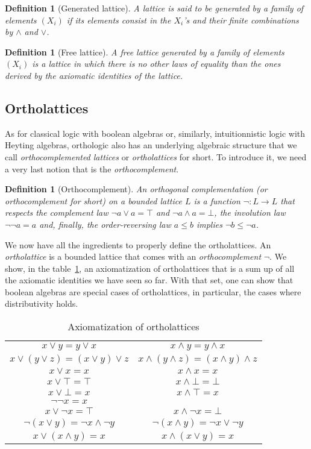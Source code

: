 \documentclass[a4paper, 11pt]{article}
\newtheorem{definition}[theorem]{Definition}
\begin{document}
    \begin{definition}[Generated lattice]
	    A lattice is said to be generated by a family of elements $(X_i)$ if its elements consist in
	    the $X_i$'s and their finite combinations by $\wedge$ and $\vee$.
    \end{definition}
    \begin{definition}[Free lattice]
	    A free lattice generated by a family of elements $(X_i)$ is a lattice in which there is no
	    other laws of equality than the ones derived by the axiomatic identities of the lattice.
    \end{definition}
    \subsection{Ortholattices}
    As for classical logic with boolean algebras or, similarly, intuitionnistic logic with Heyting 
    algebras, orthologic also has an underlying algebraic structure that we call 
    \textit{orthocomplemented lattices} or \textit{ortholattices} for short. To introduce it, we need
    a very last notion that is the \textit{orthocomplement}.
    \begin{definition}[Orthocomplement]
	    An orthogonal complementation (or orthocomplement for short) on a bounded lattice $L$ is a
	    function $\neg:L\rightarrow L$ that respects the complement law $\neg a\vee a=\top$ and
	    $\neg a\wedge a=\bot$, the involution law $\neg\neg a=a$ and, finally, the order-reversing
	    law $a\leq b$ implies $\neg b\leq\neg a$.
    \end{definition}
    We now have all the ingredients to properly define the ortholattices. An \textit{ortholattice} is a 
    bounded
    lattice that comes with an \textit{orthocomplement} $\neg$. We show, in the table~\ref{tab_ax},
    an axiomatization of ortholattices that is a sum up of all the axiomatic identities we have seen so
    far. With that set, one can show that boolean algebras are special cases of ortholattices, in 
    particular, the cases where distributivity holds.
    \begin{table}[h]
	    \caption{Axiomatization of ortholattices}
	    \label{tab_ax}
    \begin{center} 
	    \begin{tabular}{ c|c }
		    $x\vee y=y\vee x$&$x\wedge y=y\wedge x$\\
		    $x\vee(y\vee z)=(x\vee y)\vee z$&$x\wedge(y\wedge z)=(x\wedge y)\wedge z$\\
		    $x\vee x=x$&$x\wedge x=x$\\
		    $x\vee\top=\top$&$x\wedge\bot=\bot$\\
		    $x\vee\bot=x$&$x\wedge\top=x$\\
		    $\neg\neg x=x$& \\
		    $x\vee\neg x=\top$&$x\wedge\neg x=\bot$\\
		    $\neg(x\vee y)=\neg x\wedge\neg y$&$\neg(x\wedge y)=\neg x\vee\neg y$\\
		    $x\vee(x\wedge y)=x$&$x\wedge(x\vee y)=x$
	    \end{tabular}
    \end{center}
    \end{table}
\end{document}
